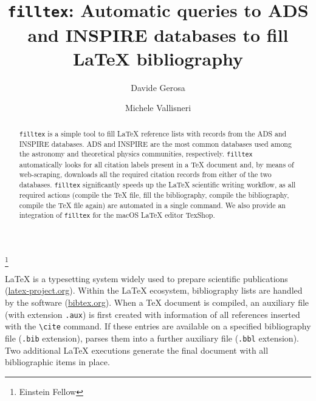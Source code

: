 \documentclass[floats,floatfix,showpacs,amssymb,prd,twocolumn,superscriptaddress,nofootinbib]{revtex4-1}
\newcommand{\filltex}{\texttt{filltex}\xspace}
\newcommand{\latex}{\LaTeX\xspace}
\newcommand{\tex}{\TeX\xspace}
\newcommand{\bibtex}{\hologo{BibTeX}\xspace}
\begin{document}
\title{\texttt{filltex}: Automatic queries to ADS and INSPIRE databases to fill \latex bibliography
}


\author{Davide Gerosa}
\thanks{Einstein Fellow}
\author{Michele Vallisneri}





\begin{abstract}
\filltex is a simple tool to fill \latex reference lists with records from the ADS and INSPIRE databases. ADS and INSPIRE are the most common databases used among the astronomy and theoretical physics  communities, respectively. \filltex automatically looks for all citation labels present in a \tex document and, by means of web-scraping, downloads all the required citation records from either of the two databases. \filltex significantly speeds up the \latex scientific writing workflow, as all required actions (compile the \tex file, fill the bibliography, compile the bibliography, compile the \tex file again) are automated in a single command. We also provide an integration of \filltex for the macOS \latex editor TexShop.
\end{abstract}


\maketitle



\latex is a typesetting system widely used to prepare scientific publications (\href{https://www.latex-project.org}{latex-project.org}). Within the \latex ecosystem, bibliography lists are handled by the \bibtex software (\href{http://www.bibtex.org/}{bibtex.org}).
When a \tex document is compiled, an auxiliary file (with extension \texttt{.aux}) is first created with information of all references inserted with the  \verb|\cite| command. If these entries are available on a specified bibliography file (\texttt{.bib} extension), \bibtex parses them into a further auxiliary file (\texttt{.bbl} extension). Two additional \latex executions generate the final document with all bibliographic items in place.
\end{document}
